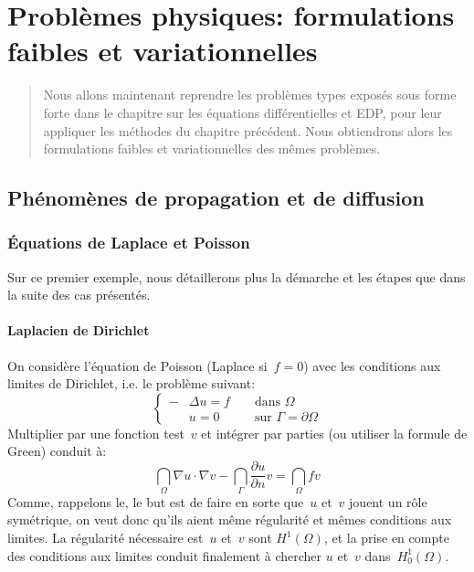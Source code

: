 \chapter{Problèmes physiques: formulations faibles et variationnelles}
\begin{abstract}
Nous allons maintenant reprendre les problèmes types exposés sous forme
forte dans le chapitre sur les équations différentielles et EDP, pour leur appliquer les méthodes
du chapitre précédent.
Nous obtiendrons alors les formulations faibles et variationnelles des mêmes problèmes.
\end{abstract}

\medskip
\section{Phénomènes de propagation et de diffusion}
\medskip
\subsection{Équations de Laplace et Poisson}

Sur ce premier exemple, nous détaillerons plus la démarche et les étapes que dans
la suite des cas présentés.

\medskip
\subsubsection{Laplacien de Dirichlet}
On considère l'équation de Poisson (Laplace si~$f=0$) avec les conditions aux limites de Dirichlet,
i.e. le problème suivant:
\begin{equation}\left\{\begin{aligned}
-&\Delta u=f &&\text{ dans } \Omega\\
&u=0 &&\text{ sur } \Gamma=\partial\Omega
\end{aligned}
\right.
\end{equation}
Multiplier par une fonction test~$v$ et intégrer par parties (ou utiliser la formule de Green) conduit à:
\begin{equation}
\dint_\Omega \nabla u\cdot\nabla v -\dint_\Gamma \dfrac{\partial u}{\partial n}v =
\dint_\Omega fv
\end{equation}
Comme, rappelons le, le but est de faire en sorte que~$u$ et~$v$ jouent un
rôle symétrique, on veut donc qu'ils aient même régularité et mêmes
conditions aux limites. La régularité nécessaire est~$u$ et~$v$ sont
$H^1(\Omega)$, et la prise en compte des conditions aux limites conduit finalement à chercher
$u$ et~$v$ dans~$H^1_0(\Omega)$.

